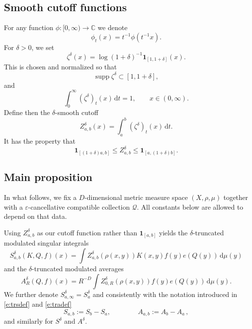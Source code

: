 \documentclass[12pt,reqno,a4paper,dvipsnames]{amsart}
\theoremstyle{plain}
\theoremstyle{definition}
\numberwithin{theorem}{section}
\numberwithin{equation}{section}
\newcommand{\AD}{D}
\DeclareMathOperator{\supp}{\operatorname{supp}}
\begin{document}
\subsection{Smooth cutoff functions}
 For any function $\phi: [0,\infty) \to \mathbb{C}$ we denote
\[
    \phi_t(x) = t^{-1} \phi(t^{-1}x).
\]
For $\delta > 0$, we set 
\begin{equation}\label{e:zeta}
    \zeta^\delta(x) = \log(1 + \delta)^{-1} \mathbf{1}_{[1,1 + \delta]}(x). 
\end{equation}
This is chosen and normalized so that
\begin{equation}
    \supp \zeta^{\delta} \subset [1, 1+\delta], \label{e:zeta_supp}
\end{equation}
and
\begin{equation}
    \int_0^\infty (\zeta^{\delta})_t(x) \, \mathrm{d}t = 1, \qquad x \in (0,\infty).\label{e:zeta_int}
\end{equation}
Define then the $\delta$-smooth cutoff
\[
    Z_{a,b}^{\delta}(x) = \int_a^b (\zeta^\delta)_t(x) \, \mathrm{d}t.
\]
It has the property that
\begin{equation}\label{e:Z_prop}
    \mathbf{1}_{[(1 + \delta)a, b]} \le  Z_{a,b}^{\delta} \le \mathbf{1}_{[a, (1 + \delta)b]}.
\end{equation}

\subsection{Main proposition}
In what follows, we fix a $\AD$-dimensional metric measure space $(X, \rho, \mu)$ together with a $\varepsilon$-cancellative compatible collection $\mathcal{Q}$. All constants below are allowed to depend on that data.

Using $Z_{a,b}^\delta$ as our cutoff function rather than $\mathbf{1}_{[a,b]}$ yields the $\delta$-truncated modulated singular integrals
\begin{equation}
    \label{e:trsdefdelta}
    S_{a,b}^{\delta}(K, Q, f)(x) = \int Z^\delta_{a,b}(\rho(x,y)) K(x,y) f(y) e(Q(y)) \, \mathrm{d}\mu(y)
\end{equation}
and the $\delta$-truncated modulated averages
\begin{equation}
    \label{e:tradefdelta}
    A_R^{\delta}(Q, f)(x) = R^{-\AD} \int Z^{\delta}_{0, R}(\rho(x,y)) f(y) e(Q(y)) \, \mathrm{d}\mu(y).
\end{equation} 
We further denote $S_{a,\infty}^\delta = S_a^\delta$ and consistently with the notation introduced in \eqref{e:trsdef} and \eqref{e:tradef}
\[
    S_{a,b} := S_b - S_a, \qquad\qquad A_{a,b} := A_b - A_a\,,
\]
and similarly for $S^\delta$ and $A^\delta$. 
\end{document}
